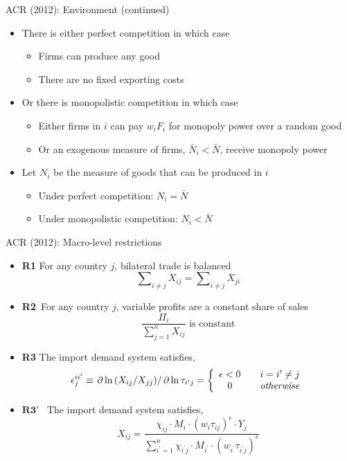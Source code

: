 \documentclass[10pt,notes=hide]{beamer}
\begin{document}
\begin{frame}{ACR (2012): Environment (continued)}
\begin{itemize}
\item There is either perfect competition in which case
\begin{itemize}
\item Firms can produce any good
\item There are no fixed exporting costs
\end{itemize}
\item Or there is monopolistic competition in which case
\begin{itemize}
\item Either firms in $i$ can pay $w_{i}F_{i}$ for monopoly power over a
random good
\item Or an exogenous measure of firms, $\bar{N}_{i}<\bar{N}$, receive
monopoly power
\end{itemize}
\item Let $N_{i}$ be the measure of goods that can be produced in $i$%
\begin{itemize}
\item Under perfect competition: $N_{i}=\bar{N}$
\item Under monopolistic competition: $N_{i}<\bar{N}$
\end{itemize}
\end{itemize}
\end{frame}
\begin{frame}{ACR (2012): Macro-level restrictions}
\begin{itemize}
\item \textbf{R1} For any country $j$, bilateral trade is balanced%
\begin{equation*}
\sum\nolimits_{i\not=j}X_{ij}=\sum\nolimits_{i\not=j}X_{ji}
\end{equation*}
\item \textbf{R2}\emph{\ }For any country $j$, variable profits are a
constant share of sales%
\begin{equation*}
\frac{\Pi _{i}}{\sum\nolimits_{j=1}^{n}X_{ij}}\text{\ is constant}
\end{equation*}
\item \textbf{R3} The import demand system satisfies,
\begin{equation*}
\epsilon _{j}^{ii^{\prime }}\equiv \left. \partial \ln \left(
X_{ij}/X_{jj}\right) \right/ \partial \ln \tau _{i^{\prime }j}=\left\{ 
\begin{array}{ccc}
\epsilon <0 &  & i=i^{\prime }\neq j \\ 
0 &  & \text{\emph{otherwise}}
\end{array}%
\right.
\end{equation*}
\item $\mathbf{R3}'$ \ The import demand system satisfies,%
\begin{equation*}
X_{ij}=\frac{\chi _{ij}\cdot M_{i}\cdot \left( w_{i}\tau _{ij}\right)
^{\epsilon }\cdot Y_{j}}{\sum\nolimits_{i^{\prime }=1}^{n}\chi
_{i^{\prime }j}\cdot M_{i^{\prime }}\cdot \left( w_{i^{\prime }}\tau
_{i^{\prime }j}\right) ^{\epsilon }}
\end{equation*}
\end{itemize}
\end{frame}
\end{document}
